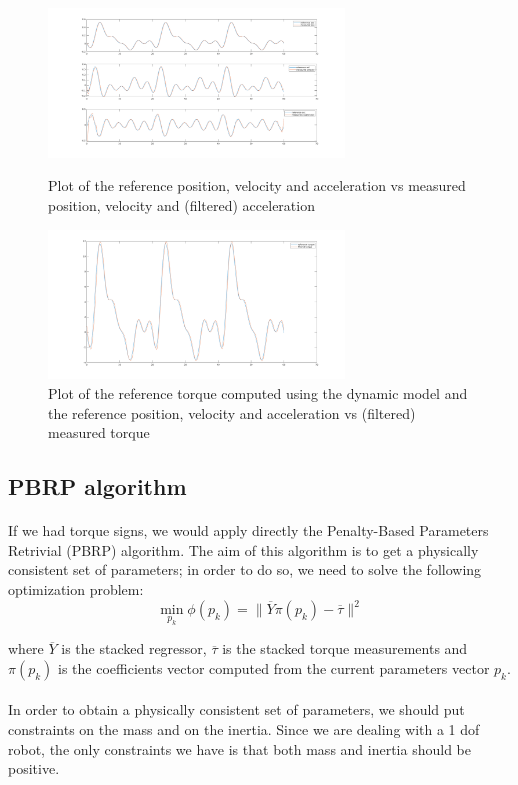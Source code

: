 \documentclass{article}
\begin{document}
\begin{figure}[!htbp]
\centering
\includegraphics[width=0.7\textwidth]{images/1-dof/new_experiment4_traj.png}
\caption{Plot of the reference position, velocity and acceleration vs measured position, velocity and (filtered) acceleration}
\includegraphics[width=0.7\textwidth]{images/1-dof/new_experiment4.png}
\caption{Plot of the reference torque computed using the dynamic model and the reference position, velocity and acceleration vs (filtered) measured torque}
\end{figure}
\FloatBarrier

\subsection{PBRP algorithm}
\paragraph{}If we had torque signs, we would apply directly the Penalty-Based Parameters Retrivial (PBRP) algorithm. The aim of this algorithm is to get a physically consistent set of parameters; in order to do so, we need to solve the following optimization problem:
\[\min_{p_k}{\phi(p_k)} = \lVert \overline{Y}\pi(p_k)-\overline{\tau} \rVert^2\]

\noindent where $\overline{Y}$ is the stacked regressor, $\overline{\tau}$ is the stacked  torque measurements and $\pi(p_k)$ is the coefficients vector computed from the current parameters vector $p_k$.

\paragraph{}In order to obtain a physically consistent set of parameters, we should put constraints on the mass and on the inertia. Since we are dealing with a 1 dof robot, the only constraints we have is that both mass and inertia should be positive.
\end{document}
